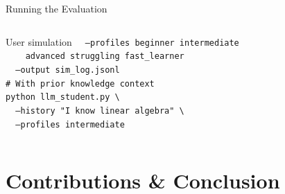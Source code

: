 \documentclass[aspectratio=169,12pt]{beamer}
\begin{document}
\begin{frame}{Running the Evaluation}
\begin{columns}
\begin{block}{User simulation}
        \texttt{\ \ --profiles beginner intermediate}\\
        \texttt{\ \ \ \ advanced struggling fast\_learner}\\
        \texttt{\ \ --output sim\_log.jsonl}\\[6pt]
        \texttt{\# With prior knowledge context}\\
        \texttt{python llm\_student.py \textbackslash}\\
        \texttt{\ \ --history "I know linear algebra" \textbackslash}\\
        \texttt{\ \ --profiles intermediate}
      \end{block}
  \end{columns}
\end{frame}

\section{Contributions \& Conclusion}
\end{document}
